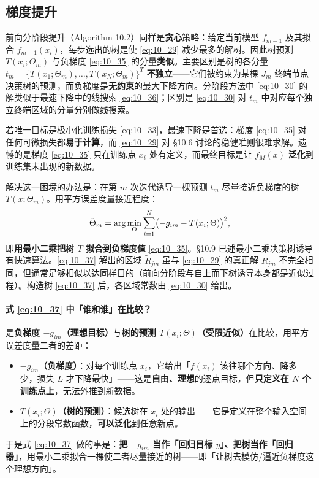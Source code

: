 \subsection{梯度提升}

前向分阶段提升（Algorithm 10.2）同样是\textbf{贪心}策略：给定当前模型 $f_{m-1}$ 及其拟合 $f_{m-1}(x_i)$，每步选出的树是使 \eqref{eq:10_29} 减少最多的解树。因此树预测 $T(x_i;\Theta_m)$ 与负梯度 \eqref{eq:10_35} 的分量\textbf{类似}。主要区别是树的各分量 $t_m = \{T(x_1;\Theta_m), \ldots, T(x_N;\Theta_m)\}^T$ \textbf{不独立}——它们被约束为某棵 $J_m$ 终端节点决策树的预测，而负梯度是\textbf{无约束}的最大下降方向。分阶段方法中 \eqref{eq:10_30} 的解类似于最速下降中的线搜索 \eqref{eq:10_36}；区别是 \eqref{eq:10_30} 对 $t_m$ 中对应每个独立终端区域的分量分别做线搜索。

若唯一目标是极小化训练损失 \eqref{eq:10_33}，最速下降是首选：梯度 \eqref{eq:10_35} 对任何可微损失都\textbf{易于计算}，而 \eqref{eq:10_29} 对 §10.6 讨论的稳健准则很难求解。遗憾的是梯度 \eqref{eq:10_35} 只在训练点 $x_i$ 处有定义，而最终目标是让 $f_M(x)$ \textbf{泛化}到训练集未出现的新数据。

解决这一困境的办法是：在第 $m$ 次迭代诱导一棵预测 $t_m$ 尽量接近负梯度的树 $T(x;\Theta_m)$。用平方误差度量接近程度：
\begin{equation}\label{eq:10_37}
    \tilde\Theta_m = \arg\min_{\Theta} \sum_{i=1}^{N} \bigl(-g_{im} - T(x_i;\Theta)\bigr)^2,
\end{equation}
即\textbf{用最小二乘把树 $T$ 拟合到负梯度值} \eqref{eq:10_35}。§10.9 已述最小二乘决策树诱导有快速算法。\eqref{eq:10_37} 解出的区域 $\tilde R_{jm}$ 虽与 \eqref{eq:10_29} 的真正解 $R_{jm}$ 不完全相同，但通常足够相似以达同样目的（前向分阶段与自上而下树诱导本身都是近似过程）。构造树 \eqref{eq:10_37} 后，各区域常数由 \eqref{eq:10_30} 给出。

\paragraph{式 \eqref{eq:10_37} 中「谁和谁」在比较？}

是\textbf{负梯度 $-g_{im}$（理想目标）}与\textbf{树的预测 $T(x_i;\Theta)$（受限近似）}在比较，用平方误差度量二者的差距：
\begin{itemize}
    \item \textbf{$-g_{im}$（负梯度）}：对每个训练点 $x_i$，它给出「$f(x_i)$ 该往哪个方向、降多少，损失 $L$ 才下降最快」——这是\textbf{自由、理想}的逐点目标，但\textbf{只定义在 $N$ 个训练点上}，无法外推到新数据。
    \item \textbf{$T(x_i;\Theta)$（树的预测）}：候选树在 $x_i$ 处的输出——它是定义在整个输入空间上的分段常数函数，\textbf{可以泛化}到任意新点。
\end{itemize}
于是式 \eqref{eq:10_37} 做的事是：\textbf{把 $-g_{im}$ 当作「回归目标 $y$」、把树当作「回归器」}，用最小二乘拟合一棵使二者尽量接近的树——即「让树去模仿/逼近负梯度这个理想方向」。

